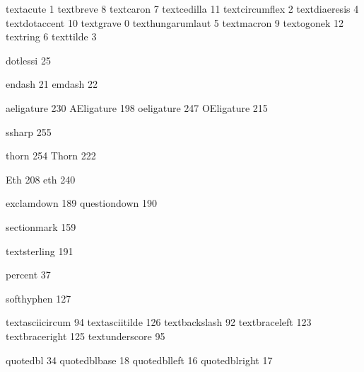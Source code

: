 
\stopmapping

\startencoding[ec][ec] %

 textacute         1
 textbreve         8
 textcaron         7
 textcedilla      11
 textcircumflex    2
 textdiaeresis     4
 textdotaccent    10
 textgrave         0
 texthungarumlaut  5
 textmacron        9
 textogonek       12
 textring          6
 texttilde         3

 dotlessi         25

 endash           21
 emdash           22

 aeligature      230
 AEligature      198
 oeligature      247
 OEligature      215

 ssharp          255

 thorn           254
 Thorn           222

 Eth             208
 eth             240

 exclamdown      189 %
 questiondown    190 %

 sectionmark     159

 textsterling    191

 percent          37

 softhyphen      127 %

 textasciicircum  94
 textasciitilde  126
 textbackslash    92
 textbraceleft   123
 textbraceright  125
 textunderscore   95

 quotedbl         34
 quotedblbase     18
 quotedblleft     16
 quotedblright    17

